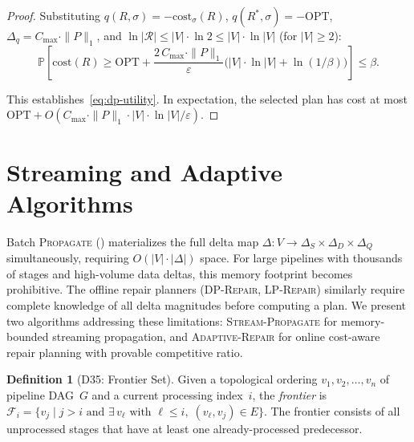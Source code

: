 \documentclass[11pt,a4paper]{article}
\theoremstyle{definition}
\newtheorem{definition}[theorem]{Definition}
\newcommand{\DeltaS}{\Delta_{\!S}}
\newcommand{\DeltaD}{\Delta_{\!D}}
\newcommand{\DeltaQ}{\Delta_{\!Q}}
\newcommand{\cost}{\mathrm{cost}}
\newcommand{\OPT}{\mathrm{OPT}}
\newcommand{\bbP}{\mathbb{P}}
\newcommand{\cR}{\mathcal{R}}
\begin{document}
\begin{proof}
Substituting $q(R, \sigma) = -\cost_\sigma(R)$,
$q(R^*, \sigma) = -\OPT$, $\Delta_q = C_{\max} \cdot \|P\|_1$, and
$\ln|\cR| \leq |V| \cdot \ln 2 \leq |V| \cdot \ln |V|$
(for $|V| \geq 2$):
\[
  \bbP\!\left[\cost(R)
    \geq \OPT + \frac{2\,C_{\max} \cdot \|P\|_1}{\varepsilon}
    \bigl(|V| \cdot \ln|V| + \ln(1/\beta)\bigr)\right]
  \leq \beta.
\]

This establishes~\eqref{eq:dp-utility}.  In expectation, the selected plan
has cost at most $\OPT + O(C_{\max} \cdot \|P\|_1 \cdot |V| \cdot
\ln|V| / \varepsilon)$.
\end{proof}




\section{Streaming and Adaptive Algorithms}
\label{sec:streaming-adaptive}

Batch \textsc{Propagate} () materializes the full delta map
$\Delta\colon V \to \DeltaS \times \DeltaD \times \DeltaQ$ simultaneously,
requiring $O(|V| \cdot |\Delta|)$ space.  For large pipelines with thousands
of stages and high-volume data deltas, this memory footprint becomes
prohibitive.  The offline repair planners (\textsc{DP-Repair},
\textsc{LP-Repair}) similarly require complete knowledge of all delta
magnitudes before computing a plan.  We present two algorithms addressing
these limitations: \textsc{Stream-Propagate} for memory-bounded streaming
propagation, and \textsc{Adaptive-Repair} for online cost-aware repair
planning with provable competitive ratio.

\begin{definition}[D35: Frontier Set]\label{def:frontier}
Given a topological ordering $v_1, v_2, \ldots, v_n$ of pipeline DAG~$G$ and
a current processing index~$i$, the \emph{frontier} is
$\mathcal{F}_i = \{v_j \mid j > i \text{ and } \exists\, v_\ell \text{ with }
\ell \leq i,\; (v_\ell, v_j) \in E\}$.
The frontier consists of all unprocessed stages that have at least one
already-processed predecessor.
\end{definition}
\end{document}
